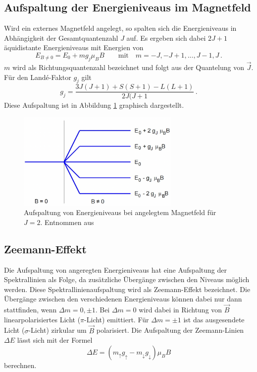     \subsection{Aufspaltung der Energieniveaus im Magnetfeld}
        Wird ein externes Magnetfeld angelegt, so spalten sich die Energieniveaus in Abhängigkeit der Gesamtquantenzahl $J$ auf.
        Es ergeben sich dabei $2J+1$ äquidistante Energieniveaus mit Energien von
        \begin{equation}
            E_{B\neq 0}=E_0+mg_j\mu_BB \qquad\text{mit}\quad m=-J,-J+1,...,J-1,J \, .
            \label{eqn:E}
        \end{equation}
        $m$ wird als Richtungsquantenzahl bezeichnet und folgt aus der Quantelung von $\vec{J}$.
        Für den Landé-Faktor $g_j$ gilt
        \begin{equation}
            g_j=\frac{3J(J+1)+S(S+1)-L(L+1)}{2J(J+1} \, .
        \end{equation}
        Diese Aufspaltung ist in Abbildung \ref{fig:Aufspaltung} graphisch dargestellt.
        \begin{figure}[h]
            \centering
            \includegraphics[width = 0.7\textwidth]{pictures/aufspaltung.png}
            \caption{Aufspaltung von Energieniveaus bei angelegtem Magnetfeld für $J=2$. Entnommen aus \cite{haken_atom-_2004}}
            \label{fig:Aufspaltung}
        \end{figure}
    \subsection{Zeemann-Effekt}
        Die Aufspaltung von angeregten Energieniveaus hat eine Aufspaltung der Spektrallinien als Folge,
        da zusätzliche Übergänge zwischen den Niveaus möglich werden.
        Diese Spektrallinienaufspaltung wird als Zeemann-Effekt bezeichnet.
        Die Übergänge zwischen den verschiedenen Energieniveaus können dabei nur dann stattfinden, wenn $\Delta m=0,\pm 1$.
        Bei $\Delta m=0$ wird dabei in Richtung von $\vec{B}$ linearpolarisiertes Licht ($\pi$-Licht) emittiert.
        Für $\Delta m=\pm 1$ ist das ausgesendete Licht ($\sigma$-Licht) zirkular um $\vec{B}$ polarisiert.
        Die Aufspaltung der Zeemann-Linien $\Delta E$ lässt sich mit der Formel
        \begin{equation}
            \Delta E= \left(m_\uparrow g_\uparrow-m_\downarrow g_\downarrow \right)\mu_BB
        \end{equation}
        berechnen.

